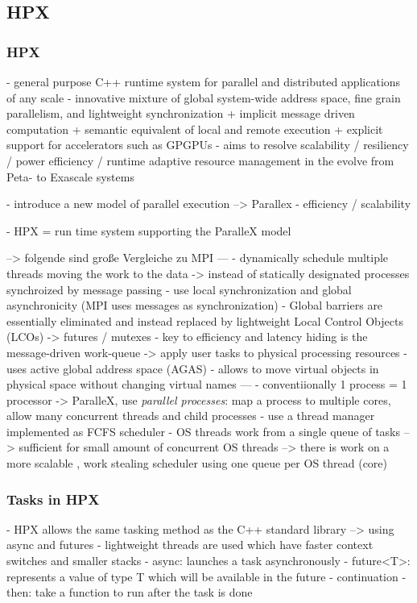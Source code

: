 \subsection{HPX}
\label{subsec:HPX}
\subsubsection{HPX}
  \cite{Kaiser.2014}
  - general purpose C++ runtime system for parallel and distributed applications of any scale
  - innovative mixture of global system-wide address space, fine grain parallelism, and lightweight synchronization
    + implicit message driven computation
    + semantic equivalent of local and remote execution
    + explicit support for accelerators such as GPGPUs
  - aims to resolve scalability / resiliency / power efficiency / runtime adaptive resource management in the evolve from Peta- to Exascale systems
  
\cite{Kaiser.2009}
  - introduce a new model of parallel execution --> Parallex
    - efficiency / scalability
    
  - HPX = run time system supporting the ParalleX model
  
--> folgende sind große Vergleiche zu MPI ---
    - dynamically schedule multiple threads moving the work to the data
     -> instead of statically designated processes synchroized by message passing
    - use local synchronization and global asynchronicity (MPI uses messages as synchronization)
    - Global barriers are essentially eliminated and instead replaced by
lightweight Local Control Objects (LCOs) -> futures / mutexes
    - key to efficiency and latency hiding is the message-driven work-queue
	  -> apply user tasks to physical processing resources
	- uses active global address space (AGAS)
	  - allows to move virtual objects in physical space without changing virtual names
	  ---
	- conventiionally 1 process = 1 processor
	  -> ParalleX, use \textit{parallel processes}: map a process to multiple cores, allow many concurrent threads and child processes
	- use a thread manager implemented as FCFS scheduler 
	  - OS threads work from a single queue of tasks 
	  --> sufficient for small amount of concurrent OS threads
	  --> there is work on a more scalable , work stealing scheduler using one queue per OS thread (core)
	  

\subsubsection{Tasks in HPX}
\cite{TheSTEARGroup.2020}
  - HPX allows the same tasking method as the C++ standard library --> using async and futures
    - lightweight threads are used which have faster context switches and smaller stacks
    - async: launches a task asynchronously
    - future<T>: represents a value of type T which will be available in the future
    - continuation - then: take a function to run after the task is done

